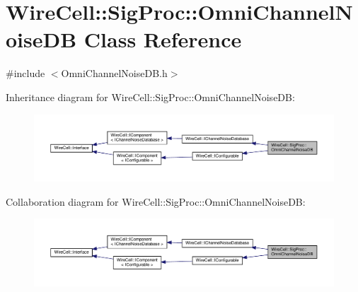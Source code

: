 \hypertarget{class_wire_cell_1_1_sig_proc_1_1_omni_channel_noise_d_b}{}\section{Wire\+Cell\+:\+:Sig\+Proc\+:\+:Omni\+Channel\+Noise\+DB Class Reference}
\label{class_wire_cell_1_1_sig_proc_1_1_omni_channel_noise_d_b}


{\ttfamily \#include $<$Omni\+Channel\+Noise\+D\+B.\+h$>$}



Inheritance diagram for Wire\+Cell\+:\+:Sig\+Proc\+:\+:Omni\+Channel\+Noise\+DB\+:
\nopagebreak
\begin{figure}[H]
\begin{center}
\leavevmode
\includegraphics[width=350pt]{class_wire_cell_1_1_sig_proc_1_1_omni_channel_noise_d_b__inherit__graph}
\end{center}
\end{figure}


Collaboration diagram for Wire\+Cell\+:\+:Sig\+Proc\+:\+:Omni\+Channel\+Noise\+DB\+:
\nopagebreak
\begin{figure}[H]
\begin{center}
\leavevmode
\includegraphics[width=350pt]{class_wire_cell_1_1_sig_proc_1_1_omni_channel_noise_d_b__coll__graph}
\end{center}
\end{figure}
